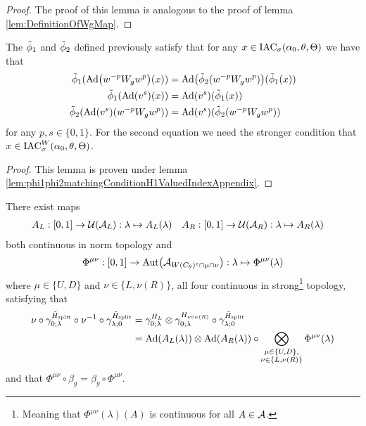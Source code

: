 \documentclass[11pt,a4paper,twoside]{article}
\numberwithin{equation}{section}
\begin{document}
\begin{proof}
	The proof of this lemma is analogous to the proof of lemma \ref{lem:DefinitionOfWgMap}.
\end{proof}
\begin{lemma}\label{lem:phi1phi2matchingConditionH1ValuedIndex}
The $\phiTilde_1$ and $\phiTilde_2$ defined previously satisfy that for any $x\in\IAC_{\sigma}(\alpha_0,\theta,\Theta)$ we have that
	\begin{align}
		\phiTilde_1(\Ad{w^{-p} W_g w^{p}}(x))&=\Ad{\phiTilde_2(w^{-p} W_g w^{p})}(\phiTilde_1(x))\\
		\phiTilde_1(\Ad{v^{s}}(x))&=\Ad{v^{s}}(\phiTilde_1(x))\\
		\phiTilde_2(\Ad{v^s}(w^{-p} W_gw^{p}))&=\Ad{v^s}(\phiTilde_2(w^{-p} W_g w^{p}))
	\end{align}
	for any $p,s\in\{0,1\}$. For the second equation we need the stronger condition that $x\in\IAC_{\sigma}^W(\alpha_0,\theta,\Theta)$.
\end{lemma}
\begin{proof}
	This lemma is proven under lemma \ref{lem:phi1phi2matchingConditionH1ValuedIndexAppendix}.
\end{proof}
\begin{lemma}\label{lem:TranslatingSplittedTimeEvolution}
	There exist maps
	\begin{align}
		A_L&:[0,1]\rightarrow \UU(\AA_L):\lambda\mapsto A_{L}(\lambda)&A_R&:[0,1]\rightarrow \UU(\AA_R):\lambda\mapsto A_{R}(\lambda)
	\end{align}
	both continuous in norm topology and
	\begin{align}
		\Phi^{\mu\nu}:[0,1]\rightarrow\Aut{\AA_{W(C_\theta)^c\cap\mu\cap\nu}}:\lambda\mapsto \Phi^{\mu\nu}(\lambda)
	\end{align}
	where $\mu\in\{U,D\}$ and $\nu\in\{L,\nu(R)\}$, all four continuous in strong\footnote{Meaning that $\Phi^{\mu\nu}(\lambda)(A)$ is continuous for all $A\in\AA$.} topology, satisfying that
	\begin{align}
		\nu\circ\gamma^{\HsplitTilde}_{0;\lambda}\circ\nu^{-1}\circ\gamma^{\HsplitTilde}_{\lambda;0}&=\gamma^{H_L}_{0;\lambda}\otimes\gamma^{H_{\nu\circ\nu(R)}}_{0;\lambda}\circ\gamma^{\HsplitTilde}_{\lambda;0}\\
		\label{eq:TranslatingSplittedTimeEvolution}
		&=\Ad{A_L(\lambda)}\otimes\Ad{A_R(\lambda)}\circ\bigotimes_{\substack{\mu\in\{U,D\},\\\nu\in\{L,\nu(R)\}}}\Phi^{\mu\nu}(\lambda)
	\end{align}
	and that $\Phi^{\mu\nu}\circ\beta_g=\beta_g\circ\Phi^{\mu\nu}$.
\end{lemma}
\end{document}

